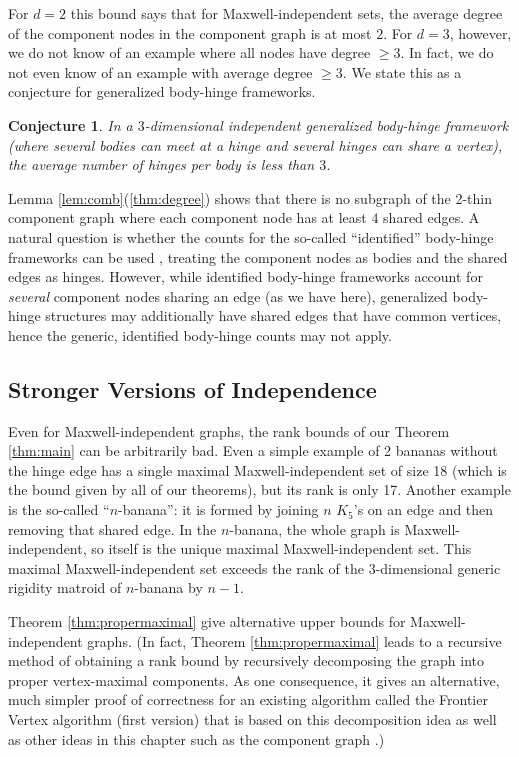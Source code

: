 \documentclass[10pt]{article}
\newtheorem{conjecture}{Conjecture}
\begin{document}
For $d=2$ this bound says that for Maxwell-independent sets, the average degree of the component nodes in the component graph is at most $2$. For $d=3$, however, we do not know of an example where all nodes have degree $\ge 3$. In fact, we do not even know of an example with average degree $\ge 3$. We state this as a conjecture for generalized body-hinge frameworks.
 
 \begin{conjecture}\label{conj:bodyhinge}
 In a $3$-dimensional independent generalized body-hinge framework (where several bodies can meet at a hinge and several hinges can share a vertex), the average number of hinges per body is less than $3$.
 \end{conjecture}
 
 
\medskip\noindent
 Lemma \ref{lem:comb}(\ref{thm:degree}) shows that there is no subgraph of the 2-thin component graph where each
 component node has at least $4$ shared edges.
 A natural question is whether the counts for the so-called ``identified'' body-hinge
 frameworks can be used \cite{tay:rigidity1984, WhWh87,KatohTanigawa2009, Tanigawa:2012}, treating the component nodes as bodies
 and the shared edges as hinges. However, while identified body-hinge
 frameworks account for {\em several} component nodes sharing an edge (as we have here), generalized body-hinge structures may additionally have shared edges that have common vertices, hence the
 generic, identified body-hinge counts may not apply.


\subsection{Stronger Versions of Independence}\label{sec:stronger}
Even for Maxwell-independent graphs, the rank bounds of our Theorem \ref{thm:main}
can be arbitrarily bad. Even a simple
example of 2 bananas without the hinge edge has a single maximal
Maxwell-independent set of size 18 (which is the bound given by all of our
theorems), but its rank is only 17. Another example is the so-called ``$n$-banana'': it is formed by joining $n$ $K_5$'s on an edge and then removing that shared edge. In the $n$-banana, the whole graph is Maxwell-independent, so itself is the unique maximal Maxwell-independent set. This maximal Maxwell-independent set exceeds the rank of the $3$-dimensional generic rigidity matroid of $n$-banana by $n-1$.

\medskip\noindent Theorem \ref{thm:propermaximal} give alternative upper bounds for Maxwell-independent graphs. (In fact, Theorem \ref{thm:propermaximal} leads to a recursive method of obtaining a rank bound by recursively decomposing the graph into proper vertex-maximal
components. As one consequence, it gives an alternative, much simpler proof of
correctness for an existing algorithm called the Frontier Vertex algorithm (first version) that is based on
this decomposition idea as well as other ideas in this
chapter such as the component graph \cite{bib:survey}.)
\end{document}
